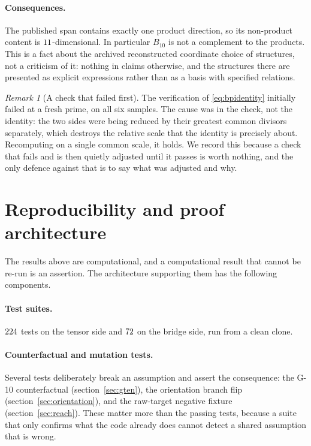 \documentclass[11pt,a4paper]{article}
\theoremstyle{definition}
\theoremstyle{remark}
\newtheorem{remark}[theorem]{Remark}
\newcommand{\Bten}{B_{10}}
\begin{document}



\paragraph{Consequences.}
The published span contains exactly one product direction, so its non-product
content is $11$-dimensional. In particular $\Bten$ is not
a complement to the products. This is a fact about the archived reconstructed coordinate
choice of structures, not a criticism of it: nothing in
\cite{Cederwall:2025invariants} claims otherwise, and the structures there are
presented as explicit expressions rather than as a basis with specified relations.

\begin{remark}[A check that failed first]
The verification of \eqref{eq:bpidentity} initially failed at a fresh prime, on
all six samples. The cause was in the check, not the identity: the two sides were
being reduced by their greatest common divisors separately, which destroys the
relative scale that the identity is precisely about. Recomputing on a single
common scale, it holds. We record this because a check that fails and is then
quietly adjusted until it passes is worth nothing, and the only defence against
that is to say what was adjusted and why.
\end{remark}



\section{Reproducibility and proof architecture}
\label{sec:repro}

The results above are computational, and a computational result that cannot be
re-run is an assertion. The architecture supporting them has the following
components.

\paragraph{Test suites.} $224$ tests on the tensor side and
$72$ on the bridge side, run from a clean clone.

\paragraph{Counterfactual and mutation tests.} Several tests deliberately break
an assumption and assert the consequence: the G-10 counterfactual
(section~\ref{sec:gten}), the orientation branch flip
(section~\ref{sec:orientation}), and the raw-target negative fixture
(section~\ref{sec:reach}). These matter more than the passing tests, because a
suite that only confirms what the code already does cannot detect a shared
assumption that is wrong.
\end{document}
